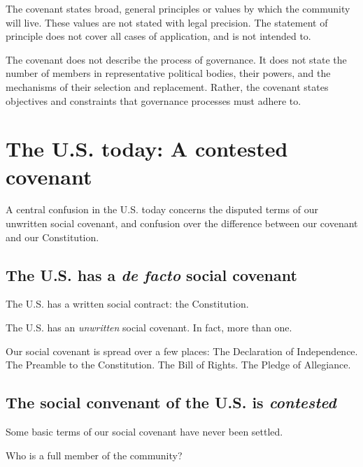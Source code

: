 \documentclass[
]{book}
\begin{document}
The covenant states broad, general principles or values by which the community will live. These values are not stated with legal precision. The statement of principle does not cover all cases of application, and is not intended to.

The covenant does not describe the process of governance. It does not state the number of members in representative political bodies, their powers, and the mechanisms of their selection and replacement. Rather, the covenant states objectives and constraints that governance processes must adhere to.

\hypertarget{the-u.s.-today-a-contested-covenant}{%
\section{The U.S. today: A contested covenant}\label{the-u.s.-today-a-contested-covenant}}

A central confusion in the U.S. today concerns the disputed terms of our unwritten social covenant, and confusion over the difference between our covenant and our Constitution.

\hypertarget{the-u.s.-has-a-de-facto-social-covenant}{%
\subsection{\texorpdfstring{The U.S. has a \emph{de facto} social covenant}{The U.S. has a de facto social covenant}}\label{the-u.s.-has-a-de-facto-social-covenant}}

The U.S. has a written social contract: the Constitution.

The U.S. has an \emph{unwritten} social covenant. In fact, more than one.

Our social covenant is spread over a few places: The Declaration of Independence. The Preamble to the Constitution. The Bill of Rights. The Pledge of Allegiance.

\hypertarget{the-social-convenant-of-the-u.s.-is-contested}{%
\subsection{\texorpdfstring{The social convenant of the U.S. is \emph{contested}}{The social convenant of the U.S. is contested}}\label{the-social-convenant-of-the-u.s.-is-contested}}

Some basic terms of our social covenant have never been settled.

Who is a full member of the community?
\end{document}
